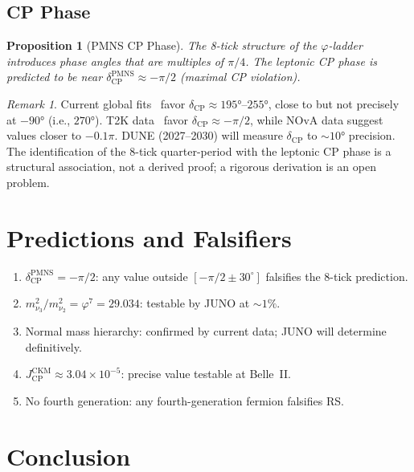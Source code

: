 \documentclass[12pt,a4paper]{article}
\newtheorem{proposition}[theorem]{Proposition}
\theoremstyle{definition}
\theoremstyle{remark}
\newtheorem{remark}[theorem]{Remark}
\begin{document}
\subsection{CP Phase}

\begin{proposition}[PMNS CP Phase]
\label{prop:pmns-cp}
The 8-tick structure of the $\varphi$-ladder introduces phase angles
that are multiples of $\pi/4$.  The leptonic CP phase is predicted to
be near $\delta_{\mathrm{CP}}^{\mathrm{PMNS}} \approx -\pi/2$ (maximal
CP violation).
\end{proposition}

\begin{remark}
Current global fits~\cite{PDG2024} favor $\delta_{\mathrm{CP}}
\approx 195°$--$255°$, close to but not precisely at $-90°$ (i.e.,
$270°$).  T2K data~\cite{T2K} favor $\delta_{\mathrm{CP}} \approx -\pi/2$, while
NOvA data suggest values closer to $-0.1\pi$.  DUNE (2027--2030) will
measure $\delta_{\mathrm{CP}}$ to $\sim 10°$ precision.  The
identification of the 8-tick quarter-period with the leptonic CP phase
is a structural association, not a derived proof; a rigorous derivation
is an open problem.
\end{remark}

\section{Predictions and Falsifiers}
\label{sec:predictions}

\begin{enumerate}
  \item $\delta_{\mathrm{CP}}^{\mathrm{PMNS}} = -\pi/2$: any value
  outside $[-\pi/2 \pm 30^\circ]$ falsifies the 8-tick prediction.
  \item $m_{\nu_3}^2/m_{\nu_2}^2 = \varphi^7 = 29.034$: testable by
  JUNO at $\sim 1\%$.
  \item Normal mass hierarchy: confirmed by current data; JUNO will
  determine definitively.
  \item $J_{\mathrm{CP}}^{\mathrm{CKM}} \approx 3.04 \times 10^{-5}$:
  precise value testable at Belle~II.
  \item No fourth generation: any fourth-generation fermion falsifies RS.
\end{enumerate}

\section{Conclusion}
\label{sec:conclusion}
\end{document}
